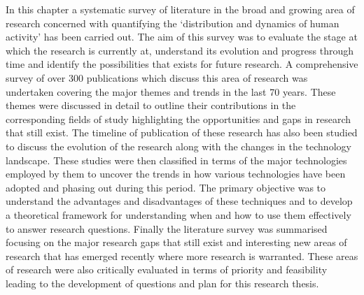 In this chapter a systematic survey of literature in the broad and growing area of research concerned with quantifying the `distribution and dynamics of human activity' has been carried out.
The aim of this survey was to evaluate the stage at which the research is currently at, understand its evolution and progress through time and identify the possibilities that exists for future research.
A comprehensive survey of over 300 publications which discuss this area of research was undertaken covering the major themes and trends in the last 70 years.
These themes were discussed in detail to outline their contributions in the corresponding fields of study highlighting the opportunities and gaps in research that still exist.
The timeline of publication of these research has also been studied to discuss the evolution of the research along with the changes in the technology landscape.
These studies were then classified in terms of the major technologies employed by them to uncover the trends in how various technologies have been adopted and phasing out during this period.
The primary objective was to understand the advantages and disadvantages of these techniques and to develop a theoretical framework for understanding when and how to use them effectively to answer research questions.
Finally the literature survey was summarised focusing on the major research gaps that still exist and interesting new areas of research that has emerged recently  where more research is warranted.
These areas of research were also critically evaluated in terms of priority and feasibility leading to the development of questions and plan for this research thesis. 

